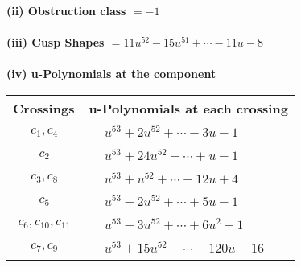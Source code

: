 \documentclass[1p]{elsarticle_modified}
\theoremstyle{definition}
\begin{document}
\flushleft \textbf{(ii) Obstruction class $= -1$}\\~\\
\flushleft \textbf{(iii) Cusp Shapes $= 11 u^{52}-15 u^{51}+\cdots-11 u-8$}\\~\\
\newpage\renewcommand{\arraystretch}{1}
\flushleft \textbf{(iv) u-Polynomials at the component}\newline \\
\begin{tabular}{m{50pt}|m{274pt}}
Crossings & \hspace{64pt}u-Polynomials at each crossing \\
\hline $$\begin{aligned}c_{1},c_{4}\end{aligned}$$&$\begin{aligned}
&u^{53}+2 u^{52}+\cdots-3 u-1
\end{aligned}$\\
\hline $$\begin{aligned}c_{2}\end{aligned}$$&$\begin{aligned}
&u^{53}+24 u^{52}+\cdots+u-1
\end{aligned}$\\
\hline $$\begin{aligned}c_{3},c_{8}\end{aligned}$$&$\begin{aligned}
&u^{53}+u^{52}+\cdots+12 u+4
\end{aligned}$\\
\hline $$\begin{aligned}c_{5}\end{aligned}$$&$\begin{aligned}
&u^{53}-2 u^{52}+\cdots+5 u-1
\end{aligned}$\\
\hline $$\begin{aligned}c_{6},c_{10},c_{11}\end{aligned}$$&$\begin{aligned}
&u^{53}-3 u^{52}+\cdots+6 u^2+1
\end{aligned}$\\
\hline $$\begin{aligned}c_{7},c_{9}\end{aligned}$$&$\begin{aligned}
&u^{53}+15 u^{52}+\cdots-120 u-16
\end{aligned}$\\
\hline
\end{tabular}\\~\\
\end{document}
